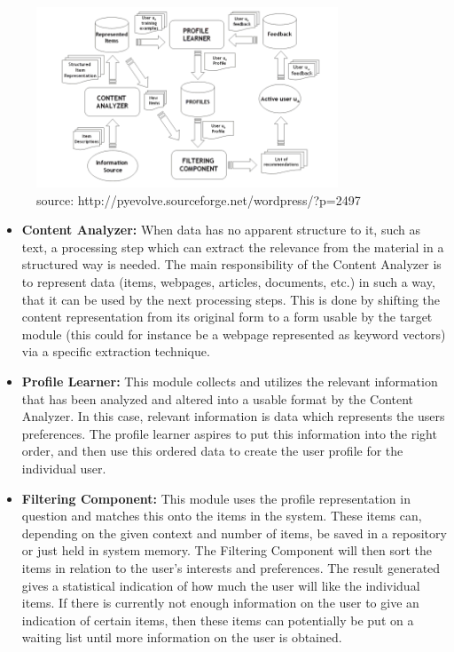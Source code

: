 \begin{figure}[H]
\centering
\includegraphics[width=90mm]{Pictures/contentdescription.png}
\caption{source: http://pyevolve.sourceforge.net/wordpress/?p=2497}
\label{contentdescription}
\end{figure}

\begin{itemize}
	\item \textbf{Content Analyzer:} When data has no apparent structure to it, such as text, a processing step which can extract the relevance from the material in a structured way is needed. \newline
	The main responsibility of the Content Analyzer is to represent data (items, webpages, articles, documents, etc.) in such a way, that it can be used by the next processing steps. This is done by shifting the content representation from its original form to a form usable by the target module (this could for instance be a webpage represented as keyword vectors) via a specific extraction technique.
	
	\item \textbf{Profile Learner:} This module collects and utilizes the relevant information that has been analyzed and altered into a usable format by the Content Analyzer. In this case, relevant information is data which represents the users preferences. The profile learner aspires to put this information into the right order, and then use this ordered data to create the user profile for the individual user.
	
	\item \textbf{Filtering Component:} This module uses the profile representation in question and matches this onto the items in the system. These items can, depending on the given context and number of items, be saved in a repository or just held in system memory. The Filtering Component will then sort the items in relation to the user's interests and preferences.\newline
	The result generated gives a statistical indication of how much the user will like the individual items. If there is currently not enough information on the user to give an indication of certain items, then these items can potentially be put on a waiting list until more information on the user is obtained.
\end{itemize}

